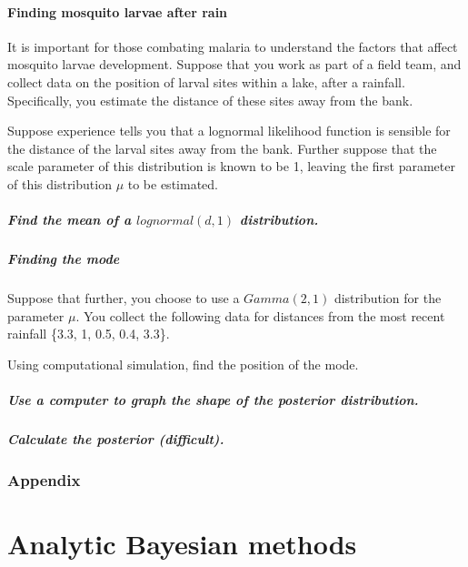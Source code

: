\documentclass[11pt,fullpage]{book}
\begin{document}
\subsection{Finding mosquito larvae after rain}
It is important for those combating malaria to understand the factors that affect mosquito larvae development. Suppose that you work as part of a field team, and collect data on the position of larval sites within a lake, after a rainfall. Specifically, you estimate the distance of these sites away from the bank. 

Suppose experience tells you that a lognormal likelihood function is sensible for the distance of the larval sites away from the bank. Further suppose that the scale parameter of this distribution is known to be 1, leaving the first parameter of this distribution $\mu$ to be estimated.

\subsubsection{Find the mean of a $lognormal(d,1)$ distribution.}

\subsubsection{Finding the mode}
Suppose that further, you choose to use a $Gamma(2,1)$ distribution for the parameter $\mu$. You collect the following data for distances from the most recent rainfall \{3.3, 1, 0.5, 0.4, 3.3\}.

Using computational simulation, find the position of the mode.

\subsubsection{Use a computer to graph the shape of the posterior distribution.}

\subsubsection{Calculate the posterior (difficult).}


\section{Appendix}\label{sec:Denominator_appendix}

\part{Analytic Bayesian methods}\label{part:analyticalBayes}
\end{document}
